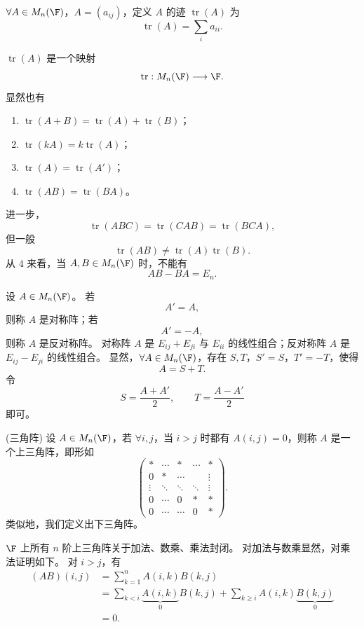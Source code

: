 \begin{definition}\label{p1:concept:c3-l826}
	$\forall A\in M_n(\F)$，$A=(a_{ij})$，定义 $A$ 的迹 $\operatorname{tr}(A)$ 为
	\[
	\operatorname{tr}(A)=\sum_i a_{ii}.
	\]
	
\end{definition}
$\operatorname{tr}(A)$ 是一个映射
\[
\operatorname{tr}:M_n(\F)\longrightarrow\F.
\]
显然也有
\begin{enumerate}
	\item $\operatorname{tr}(A+B)=\operatorname{tr}(A)+\operatorname{tr}(B)$；
	\item $\operatorname{tr}(kA)=k\operatorname{tr}(A)$；
	\item $\operatorname{tr}(A)=\operatorname{tr}(A')$；
	\item $\operatorname{tr}(AB)=\operatorname{tr}(BA)$。
\end{enumerate}
进一步，
\[
\operatorname{tr}(ABC)=\operatorname{tr}(CAB)=\operatorname{tr}(BCA),
\]
但一般
\[
\operatorname{tr}(AB)\neq\operatorname{tr}(A)\operatorname{tr}(B).
\]
从 $4$ 来看，当 $A,B\in M_n(\F)$ 时，不能有
\[
AB-BA=E_n.
\]
\begin{definition}\label{p1:concept:c3-l856}
	设 $A\in M_n(\F)$。
	若
	\[
	A'=A,
	\]
	则称 $A$ 是对称阵；若
	\[
	A'=-A,
	\]
	则称 $A$ 是反对称阵。
	对称阵 $A$ 是 $E_{ij}+E_{ji}$ 与 $E_{ii}$ 的线性组合；反对称阵 $A$ 是 $E_{ij}-E_{ji}$ 的线性组合。
	显然，$\forall A\in M_n(\F)$，存在 $S,T$，$S'=S$，$T'=-T$，使得
	\[
	A=S+T.
	\]
	令
	\[
	S=\frac{A+A'}{2},
	\qquad
	T=\frac{A-A'}{2}
	\]
	即可。
\end{definition}

\begin{definition}(三角阵)\label{p1:concept:c3-l881}
	设 $A\in M_n(\F)$，若 $\forall i,j$，当 $i>j$ 时都有 $A(i,j)=0$，则称 $A$ 是一个上三角阵，即形如
	\[
	\begin{pmatrix}
		*&\cdots&*&\cdots&*\\
		0&*&\cdots& &\vdots\\
		\vdots&\ddots&\ddots&\ddots&\vdots\\
		0&\cdots&0&*&*\\
		0&\cdots&\cdots&0&*
	\end{pmatrix}.
	\]
	类似地，我们定义出下三角阵。
\end{definition}

$\F$ 上所有 $n$ 阶上三角阵关于加法、数乘、乘法封闭。
对加法与数乘显然，对乘法证明如下。
对 $i>j$，有
\[
\begin{aligned}
	(AB)(i,j)
	&=\sum_{k=1}^{n}A(i,k)B(k,j)\\
	&=\sum_{k<i}\underbrace{A(i,k)}_{0}B(k,j)
	+\sum_{k\geq i}A(i,k)\underbrace{B(k,j)}_{0}\\
	&=0.
\end{aligned}
\]

